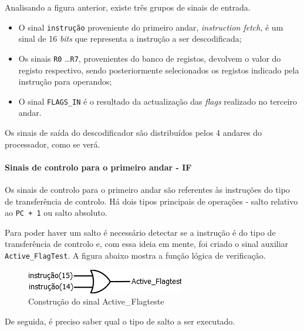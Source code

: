 \documentclass[11pt]{article}
\numberwithin{equation}{section}
\begin{document}
Analisando a figura anterior, existe três grupos de sinais de entrada.

\vspace{-2mm}

\begin{itemize}
	\item  O sinal \texttt{instrução} proveniente do primeiro andar, \textit{instruction fetch}, é um sinal de 16 \textit{bits} que representa a instrução a ser descodificada;
	\vspace{-2.5mm}
	\item Os sinais \texttt{R0} \ldots \texttt{R7}, provenientes do banco de registos, devolvem o valor do registo respectivo, sendo posteriormente selecionados os registos indicado pela instrução para operandos;
	\vspace{-2.5mm}
	\item  O sinal \texttt{FLAGS\_IN} é o resultado da actualização das \textit{flags} realizado no terceiro andar.
\end{itemize}

Os sinais de saída do descodificador são distribuídos pelos 4 andares do processador, como se verá.
	
\paragraph{Sinais de controlo para o primeiro andar - IF} 

Os sinais de controlo para o primeiro andar são referentes às instruções do tipo de transferência de controlo. Há dois tipos principais de operações - salto relativo ao \texttt{PC + 1} ou salto absoluto. 

Para poder haver um salto é necessário detectar se a instrução é do tipo de transferência de controlo e, com essa ideia em mente, foi criado o sinal auxiliar \texttt{Active\_FlagTest}. A figura abaixo mostra a função lógica de verificação. 

\vspace{2mm}

\begin{figure}[H]
	\centering
	\includegraphics[keepaspectratio=true, scale=0.55]{imagens/active_flagtest}
	\caption{Construção do sinal Active\_Flagteste}
	\vspace{-0.8em}
\end{figure}
De seguida, é preciso saber qual o tipo de salto a ser executado. 
\end{document}
